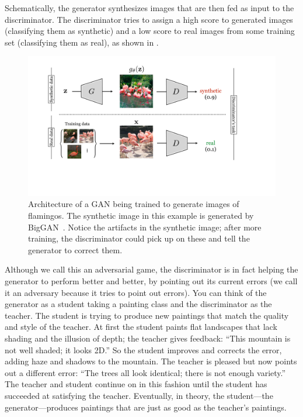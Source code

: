 Schematically, the generator synthesizes images that are then fed as input to the discriminator. The discriminator tries to assign a high score to generated images (classifying them as synthetic) and a low score to real images from some training set (classifying them as real), as shown in \fig{\ref{fig:generative_models:generative_models:gan_schematic}}.
\begin{figure}[h!]
    \centerline{
    \includegraphics[width=1.0\linewidth]{./figures/generative_models/gan_schematic.pdf}
    }
    \caption{Architecture of a GAN being trained to generate images of flamingos. The synthetic image in this example is generated by BigGAN~\cite{brock2018large}. Notice the artifacts in the synthetic image; after more training, the discriminator could pick up on these and tell the generator to correct them.}
    \label{fig:generative_models:generative_models:gan_schematic}
\end{figure}

Although we call this an adversarial game, the discriminator is in fact helping the generator to perform better and better, by pointing out its current errors (we call it an adversary because it tries to point out errors). You can think of the generator as a student taking a painting class and the discriminator as the teacher. The student is trying to produce new paintings that match the quality and style of the teacher. At first the student paints flat landscapes that lack shading and the illusion of depth; the teacher gives feedback: ``This mountain is not well shaded; it looks 2D.'' So the student improves and corrects the error, adding haze and shadows to the mountain. The teacher is pleased but now points out a different error: ``The trees all look identical; there is not enough variety.'' The teacher and student continue on in this fashion until the student has succeeded at satisfying the teacher. Eventually, in theory, the student—the generator—produces paintings that are just as good as the teacher’s paintings.

